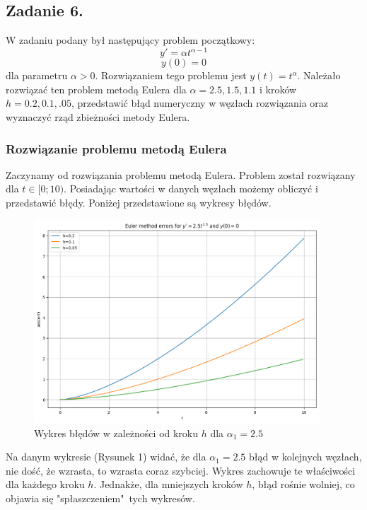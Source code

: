 \documentclass{article}
\begin{document}
\subsection{Zadanie 6.}
W zadaniu podany był następujący problem początkowy:
$$y' = \alpha t^{\alpha-1}$$
$$y(0) = 0$$
dla parametru $\alpha > 0$. Rozwiązaniem tego problemu jest $y(t) = t^{\alpha}$. Należało rozwiązać ten problem metodą Eulera dla $\alpha = 2.5, 1.5, 1.1$ i kroków $h = 0.2, 0.1, .05$, przedstawić błąd numeryczny w węzłach rozwiązania oraz wyznaczyć rząd zbieżności metody Eulera.

\subsubsection{Rozwiązanie problemu metodą Eulera}
Zaczynamy od rozwiązania problemu metodą Eulera. Problem został rozwiązany dla $t \in [0; 10)$. Posiadając wartości w danych węzłach możemy obliczyć i przedstawić błędy. Poniżej przedstawione są wykresy błędów.
\begin{figure}[H]
    \centering
    \includegraphics[width=0.95\textwidth]{1}
    \caption{Wykres błędów w zależności od kroku $h$ dla $\alpha_1 = 2.5$}
    \label{fig:mesh}
\end{figure}
Na danym wykresie (Rysunek 1) widać, że dla $\alpha_1 = 2.5$ błąd w kolejnych węzłach, nie dość, że wzrasta, to wzrasta coraz szybciej. Wykres zachowuje te właściwości dla każdego kroku $h$. Jednakże, dla mniejszych kroków $h$, błąd rośnie wolniej, co objawia się "spłaszczeniem"\ tych wykresów.
\end{document}
